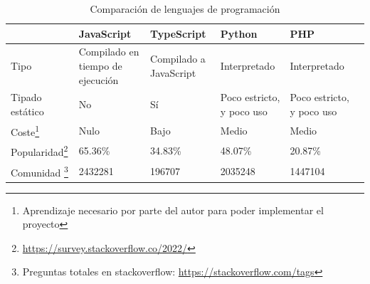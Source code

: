 \begin{table}
\begin{minipage}{\textwidth}
\begin{tabularx}{\textwidth}{|l|X|X|X|X|}
\hline
                                                    & JavaScript                       & TypeScript             & Python                    & PHP                       \\
\hline
Tipo                                                & Compilado en tiempo de ejecución & Compilado a JavaScript & Interpretado              & Interpretado              \\
\hline
Tipado estático                                     & No                               & Sí                     & Poco estricto, y poco uso & Poco estricto, y poco uso \\
\hline
Coste\footnote{Aprendizaje necesario por parte del autor para poder implementar el proyecto}                                & Nulo                             & Bajo                   & Medio                     & Medio                     \\
\hline
Popularidad\footnote{\url{https://survey.stackoverflow.co/2022/}} & 65.36\%                          & 34.83\%                & 48.07\%                   & 20.87\%                   \\
\hline
Comunidad \footnote{Preguntas totales en stackoverflow: \url{https://stackoverflow.com/tags}}      & 2432281                          & 196707                 & 2035248                   & 1447104                  &
\hline
\end{tabularx}
\end{minipage}
\caption{Comparación de lenguajes de programación}\label{tab:comparacionLenguajes}
\end{table}


